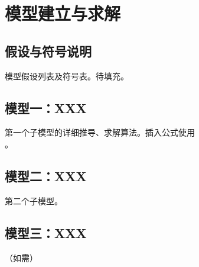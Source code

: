 \section{模型建立与求解}
\label{sec:model}

\subsection{假设与符号说明}
\label{sec:assumptions}
模型假设列表及符号表。待填充。

\subsection{模型一：XXX}
\label{sec:model1}
第一个子模型的详细推导、求解算法。插入公式使用 \begin{equation}\label{eq:...}\end{equation}。

\subsection{模型二：XXX}
\label{sec:model2}
第二个子模型。

\subsection{模型三：XXX}
\label{sec:model3}
（如需）

